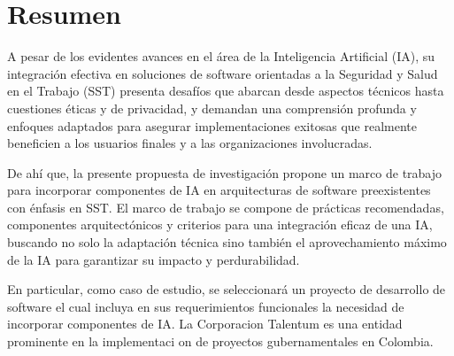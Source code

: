 
\section*{Resumen}
A pesar de los evidentes avances en el área de la Inteligencia Artificial (IA), su integración efectiva en soluciones de software orientadas a la Seguridad y Salud en el Trabajo (SST) presenta desafíos que abarcan desde aspectos técnicos hasta cuestiones éticas y de privacidad, y demandan una comprensión profunda y enfoques adaptados para asegurar implementaciones exitosas que realmente beneficien a los usuarios finales y a las organizaciones involucradas.

De ahí que, la presente propuesta de investigación propone un marco de trabajo para incorporar componentes de IA en arquitecturas de software preexistentes con énfasis en SST. El marco de trabajo se compone de prácticas recomendadas, componentes arquitectónicos y criterios para una integración eficaz de una IA, buscando no solo la adaptación técnica sino también el aprovechamiento máximo de la IA para garantizar su impacto y perdurabilidad. 

En particular, como caso de estudio, se seleccionará un proyecto de desarrollo de software el cual incluya en sus requerimientos funcionales la necesidad de incorporar componentes de IA. La Corporacion Talentum es una entidad prominente en la implementaci on de proyectos gubernamentales en Colombia.




